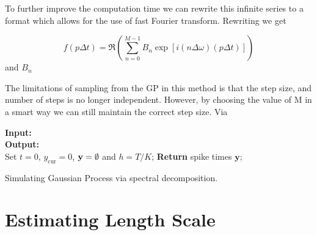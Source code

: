 \documentclass[../main.tex]{subfiles}
\begin{document}
To further improve the computation time we can rewrite this infinite series to a format which allows for the use of fast Fourier transform. Rewriting we get

$$
f(p \Delta t) = \Re \left( \sum^{M-1}_{n=0} B_n \exp \left[i (n\Delta \omega ) (p \Delta t) \right] \right)
$$
and $B_n$ 

The limitations of sampling from the GP in this method is that the step size, and number of steps is no longer independent. However, by choosing the value of M in a smart way we can still maintain the correct step size. Via 

\begin{algorithm}[t]
\DontPrintSemicolon
\textbf{Input:}\\ 
\textbf{Output:}\\
\vspace{0.3cm}
Set $t=0$, $y_{\mathrm{cur}} = 0$, $\mathbf{y} = \emptyset$ and $h = T/K$; \;
\textbf{Return} spike times $\mathbf{y}$; \;
\caption{Simulating Gaussian Process via spectral decomposition.}
\end{algorithm}


\section{Estimating Length Scale}
\end{document}
